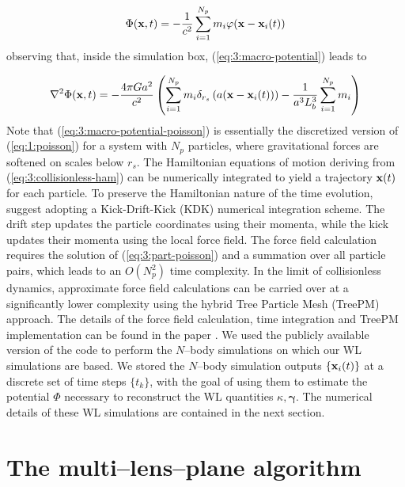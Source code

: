 \begin{equation}
\label{eq:3:macro-potential}
\Phi(\mathbf{x},t) = -\frac{1}{c^2}\sum_{i=1}^{N_p} m_i\varphi(\mathbf{x}-\mathbf{x}_i(t))
\end{equation} 
%
observing that, inside the simulation box, (\ref{eq:3:macro-potential}) leads to 

\begin{equation}
\label{eq:3:macro-potential-poisson}
\nabla^2\Phi(\mathbf{x},t) = -\frac{4\pi Ga^2}{c^2}\left(\sum_{i=1}^{N_p}m_i\delta_{r_s}\left(a(\mathbf{x}-\mathbf{x}_i(t))\right)-\frac{1}{a^3L_b^3}\sum_{i=1}^{N_p}m_i\right)
\end{equation}
%
Note that (\ref{eq:3:macro-potential-poisson}) is essentially the discretized version of (\ref{eq:1:poisson}) for a system with $N_p$ particles, where gravitational forces are softened on scales below $r_s$. The Hamiltonian equations of motion deriving from (\ref{eq:3:collisionless-ham}) can be numerically integrated to yield a trajectory $\mathbf{x}(t)$ for each particle. To preserve the Hamiltonian nature of the time evolution, \citep{gadget2} suggest adopting a Kick-Drift-Kick (KDK) numerical integration scheme. The drift step updates the particle coordinates using their momenta, while the kick updates their momenta using the local force field. The force field calculation requires the solution of (\ref{eq:3:part-poisson}) and a summation over all particle pairs, which leads to an $O(N_p^2)$ time complexity. In the limit of collisionless dynamics, approximate force field calculations can be carried over at a significantly lower complexity using the hybrid Tree Particle Mesh (TreePM) approach. The details of the force field calculation, time integration and TreePM implementation can be found in the  paper \citep{gadget2}. We used the publicly available version of the  code to perform the $N$--body simulations on which our WL simulations are based. We stored the $N$--body simulation outputs $\{\mathbf{x}_i(t)\}$ at a discrete set of time steps $\{t_k\}$, with the goal of using them to estimate the potential $\Phi$ necessary to reconstruct the WL quantities $\kappa,\pmb{\gamma}$. The numerical details of these WL simulations are contained in the next section.  


\section{The multi--lens--plane algorithm}

